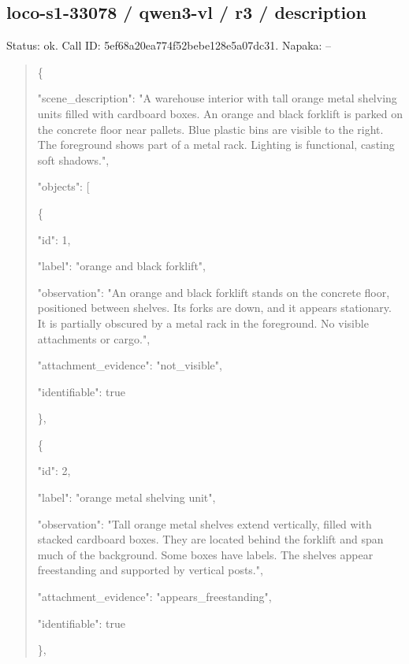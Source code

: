 \documentclass[10pt,a4paper]{article}
\begin{document}
\subsection*{loco-s1-33078 / qwen3-vl / r3 / description}
Status: ok. Call ID: 5ef68a20ea774f52bebe128e5a07dc31. Napaka: --
\begin{quote}\footnotesize
\{\par
  "scene\_description":\allowbreak{} "A warehouse interior with tall orange metal shelving units filled with cardboard boxes. An orange and black forklift is parked on the concrete floor near pallets. Blue plastic bins are visible to the right. The foreground shows part of a metal rack. Lighting is functional,\allowbreak{} casting soft shadows.",\allowbreak{}\par
  "objects":\allowbreak{} [\par
    \{\par
      "id":\allowbreak{} 1,\allowbreak{}\par
      "label":\allowbreak{} "orange and black forklift",\allowbreak{}\par
      "observation":\allowbreak{} "An orange and black forklift stands on the concrete floor,\allowbreak{} positioned between shelves. Its forks are down,\allowbreak{} and it appears stationary. It is partially obscured by a metal rack in the foreground. No visible attachments or cargo.",\allowbreak{}\par
      "attachment\_evidence":\allowbreak{} "not\_visible",\allowbreak{}\par
      "identifiable":\allowbreak{} true\par
    \},\allowbreak{}\par
    \{\par
      "id":\allowbreak{} 2,\allowbreak{}\par
      "label":\allowbreak{} "orange metal shelving unit",\allowbreak{}\par
      "observation":\allowbreak{} "Tall orange metal shelves extend vertically,\allowbreak{} filled with stacked cardboard boxes. They are located behind the forklift and span much of the background. Some boxes have labels. The shelves appear freestanding and supported by vertical posts.",\allowbreak{}\par
      "attachment\_evidence":\allowbreak{} "appears\_freestanding",\allowbreak{}\par
      "identifiable":\allowbreak{} true\par
    \},\allowbreak{}\par

\end{quote}
\end{document}
